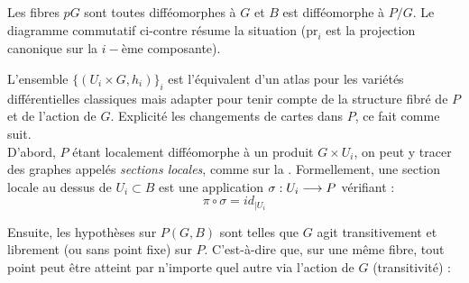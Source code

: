 \begin{definition}
\begin{adjustbox}{valign=C,raise=1cm, minipage={1.1\linewidth}}
		Les fibres $pG$ sont toutes difféomorphes à $G$ et $B$ est difféomorphe à $P/G$. Le diagramme commutatif ci-contre résume la situation ($\text{pr}_i$ est la projection canonique sur la $i-$ème composante).
	\end{adjustbox}
\end{definition}
\skipl 


L'ensemble $\big\{(U_i\times G, h_i)\big\}_i$ est l'équivalent d'un atlas pour les variétés différentielles classiques mais adapter pour tenir compte de la structure fibré de $P$ et de l'action de $G$. Explicité les changements de cartes dans $P$, ce fait comme suit.
\\
D'abord, $P$ étant localement difféomorphe à un produit $G\times U_i$, on peut y tracer des graphes appelés \emph{sections locales}, comme sur la  . Formellement, une section locale au dessus  de $U_i \subset B$ est une application $\sigma : U_i \longrightarrow P$ vérifiant :
\[\pi\circ \sigma = id_{{\displaystyle |}U_i}\]
\begin{figure}[H]
	\begin{floatrow}
		
	\end{floatrow}
\end{figure}
\noindent
Ensuite, les hypothèses sur $P(G,B)$ sont telles que $G$ agit transitivement et librement (ou sans point fixe) sur $P$. C'est-à-dire que, sur une même fibre, tout point peut être atteint par n'importe quel autre via l'action de $G$ (transitivité) :
